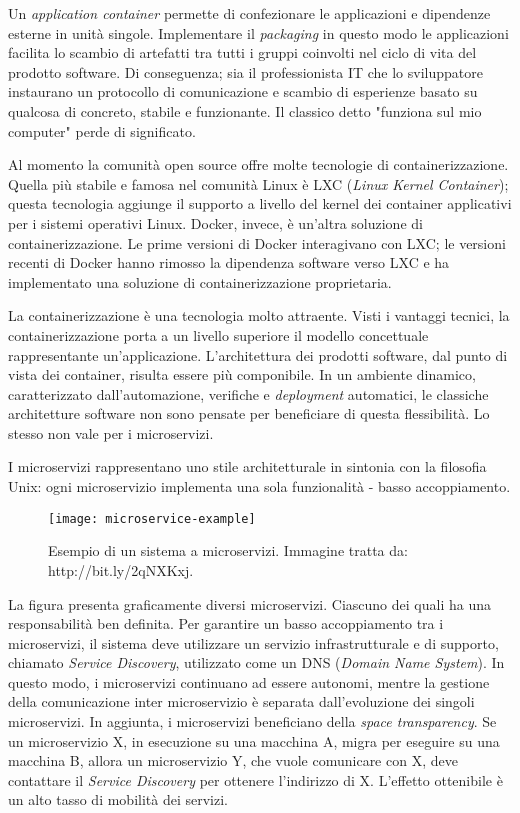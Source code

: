 Un \textit{application container} permette di confezionare le applicazioni e 
dipendenze esterne in unità singole. Implementare il \textit{packaging} in 
questo modo le applicazioni facilita lo scambio di artefatti tra tutti i gruppi 
coinvolti nel ciclo di vita del prodotto software. Di conseguenza; sia il 
professionista IT che lo sviluppatore instaurano un protocollo di comunicazione 
e scambio di esperienze basato su qualcosa di concreto, stabile e funzionante.
Il classico detto "funziona sul mio computer" perde di significato.

Al momento la comunità open source offre molte tecnologie di 
containerizzazione. Quella più stabile e famosa nel comunità Linux è LXC 
(\textit{Linux Kernel Container}); questa tecnologia aggiunge il supporto a 
livello del kernel dei container applicativi per i sistemi operativi Linux. 
Docker, invece, è un'altra soluzione di containerizzazione. Le prime versioni 
di Docker interagivano con LXC; le versioni recenti di Docker hanno rimosso la 
dipendenza software verso LXC e ha implementato una soluzione di 
containerizzazione proprietaria. 

La containerizzazione è una tecnologia molto attraente. Visti i vantaggi 
tecnici, la containerizzazione porta a un livello superiore il modello 
concettuale rappresentante un'applicazione.  L'architettura dei prodotti 
software, dal punto di vista dei container, risulta essere più componibile. In 
un ambiente dinamico, caratterizzato dall'automazione, verifiche e 
\textit{deployment} automatici, le classiche architetture software non sono 
pensate per beneficiare di questa flessibilità. Lo stesso non vale per i  
microservizi. 

I microservizi rappresentano uno stile architetturale in sintonia con la 
filosofia Unix: ogni microservizio implementa una sola funzionalità - basso 
accoppiamento.

\begin{figure}[htbp]
	\begin{center}
		\texttt{[image: microservice-example]}
		\caption{Esempio di un sistema a microservizi. Immagine tratta 
da: http://bit.ly/2qNXKxj.}
	\end{center}
\end{figure}

La figura presenta graficamente diversi microservizi. Ciascuno dei quali ha una 
responsabilità ben definita. Per garantire un basso accoppiamento tra i 
microservizi, il sistema deve utilizzare un servizio infrastrutturale e di 
supporto, chiamato \textit{Service Discovery}, utilizzato come un DNS 
(\textit{Domain Name System}). In questo modo, i microservizi continuano ad 
essere autonomi, mentre la gestione della comunicazione inter microservizio è 
separata dall'evoluzione dei singoli microservizi. 
In aggiunta, i microservizi beneficiano della \textit{space transparency}. Se 
un microservizio X, in esecuzione su una macchina A, migra per eseguire su una 
macchina B, allora un microservizio Y, che vuole comunicare con X, deve 
contattare il \textit{Service Discovery} per ottenere l'indirizzo di X. 
L'effetto ottenibile è un alto tasso di mobilità dei servizi.  


